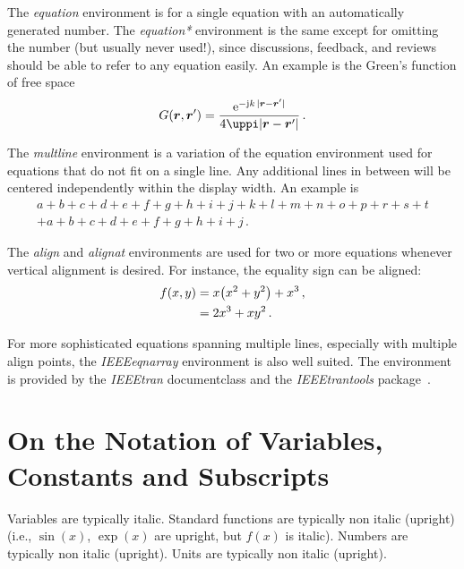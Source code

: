The \emph{equation} environment is for a single equation with an automatically generated number. 
The \emph{equation*} environment is the same except for omitting the number (but usually never used!), since discussions, feedback, and reviews should be able to refer to any equation easily. 
An example is the Green's function of free space
\begin{equation}
    G\left(\veg r, \veg r'\right) = \frac{\mathrm{e}^{-\mathrm{j} k \, \abs{\veg r - \veg r'}}}{4 \uppi \abs{\veg r - \veg r'}}\,. 
    \label{eq:ScalarGreen1}
\end{equation}

The \emph{multline} environment is a variation of the equation environment used for equations that do not fit on a single line. 
Any additional lines in between will be centered independently within the display width. 
An example is
\begin{multline}
    a+b+c+d+e+f+g+h+i+j+k+l+m+n+o+p+r+s+t \\ +a+b+c+d+e+f+g+h+i+j\,.
\end{multline}

The \emph{align} and \emph{alignat} environments are used for two or more equations whenever vertical alignment
is desired. 
For instance, the equality sign can be aligned:
\begin{align}
    f(x,y) &= x \left(x^2 + y^2\right) + x^3\,, \notag \\
    &= 2x^3 + xy^2\,.
\end{align}

For more sophisticated equations spanning multiple lines, especially with multiple align points, the \emph{IEEEeqnarray} environment is also well suited.
The environment is provided by the \emph{IEEEtran} documentclass and the \emph{IEEEtrantools} package~\cite{moser_howtoequations_2017}.


\section{On the Notation of Variables, Constants and Subscripts}\label{sec:OnVariablesandConstants} %
Variables are typically italic.
Standard functions are typically non italic (upright) (i.e., $\sin(x)$, $\exp(x)$ are upright, but $f(x)$ is italic).
Numbers are typically non italic (upright).
Units are typically non italic (upright).

